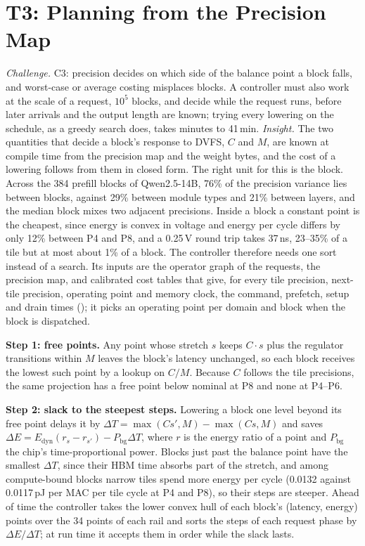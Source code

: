 \section{T3: Planning from the Precision Map}
\label{sec:pivot}

\emph{Challenge.} C3: precision decides on which side of the balance point a block falls, and worst-case or average costing misplaces blocks.
A controller must also work at the scale of a request, $10^5$ blocks, and decide while the request runs, before later arrivals and the output length are known; trying every lowering on the schedule, as a greedy search does, takes minutes to 41\,min.
\emph{Insight.} The two quantities that decide a block's response to DVFS, $C$ and $M$, are known at compile time from the precision map and the weight bytes, and the cost of a lowering follows from them in closed form.
The right unit for this is the block. Across the 384 prefill blocks of Qwen2.5-14B, 76\% of the precision variance lies between blocks, against 29\% between module types and 21\% between layers, and the median block mixes two adjacent precisions. Inside a block a constant point is the cheapest, since energy is convex in voltage and energy per cycle differs by only 12\% between P4 and P8, and a 0.25\,V round trip takes 37\,ns, 23--35\% of a tile but at most about 1\% of a block.
The controller therefore needs one sort instead of a search.
Its inputs are the operator graph of the requests, the precision map, and calibrated cost tables that give, for every tile precision, next-tile precision, operating point and memory clock, the command, prefetch, setup and drain times (); it picks an operating point per domain and block when the block is dispatched.

\textbf{Step 1: free points.}
Any point whose stretch $s$ keeps $C\cdot s$ plus the regulator transitions within $M$ leaves the block's latency unchanged, so each block receives the lowest such point by a lookup on $C/M$.
Because $C$ follows the tile precisions, the same projection has a free point below nominal at P8 and none at P4--P6.

\textbf{Step 2: slack to the steepest steps.}
Lowering a block one level beyond its free point delays it by $\Delta T=\max(C s',M)-\max(C s,M)$ and saves $\Delta E=E_{\mathrm{dyn}}(r_s-r_{s'})-P_{\mathrm{bg}}\Delta T$, where $r$ is the energy ratio of a point and $P_{\mathrm{bg}}$ the chip's time-proportional power.
Blocks just past the balance point have the smallest $\Delta T$, since their HBM time absorbs part of the stretch, and among compute-bound blocks narrow tiles spend more energy per cycle (0.0132 against 0.0117\,pJ per MAC per tile cycle at P4 and P8), so their steps are steeper.
Ahead of time the controller takes the lower convex hull of each block's (latency, energy) points over the 34 points of each rail and sorts the steps of each request phase by $\Delta E/\Delta T$; at run time it accepts them in order while the slack lasts.

